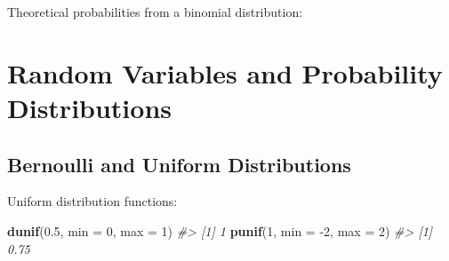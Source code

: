 \documentclass[]{book}
\newenvironment{Shaded}{\begin{snugshade}}{\end{snugshade}}
\newcommand{\CommentTok}[1]{\textcolor[rgb]{0.56,0.35,0.01}{\textit{#1}}}
\newcommand{\DataTypeTok}[1]{\textcolor[rgb]{0.13,0.29,0.53}{#1}}
\newcommand{\DecValTok}[1]{\textcolor[rgb]{0.00,0.00,0.81}{#1}}
\newcommand{\FloatTok}[1]{\textcolor[rgb]{0.00,0.00,0.81}{#1}}
\newcommand{\KeywordTok}[1]{\textcolor[rgb]{0.13,0.29,0.53}{\textbf{#1}}}
\newcommand{\NormalTok}[1]{#1}
\newcommand{\OperatorTok}[1]{\textcolor[rgb]{0.81,0.36,0.00}{\textbf{#1}}}
\newcommand{\OtherTok}[1]{\textcolor[rgb]{0.56,0.35,0.01}{#1}}
\newcommand{\StringTok}[1]{\textcolor[rgb]{0.31,0.60,0.02}{#1}}
\theoremstyle{definition}
\theoremstyle{definition}
\theoremstyle{definition}
\theoremstyle{remark}
\begin{document}
Theoretical probabilities from a binomial distribution:

\begin{Shaded}
\end{Shaded}

\hypertarget{random-variables-and-probability-distributions}{%
\section{Random Variables and Probability
Distributions}\label{random-variables-and-probability-distributions}}

\hypertarget{bernoulli-and-uniform-distributions}{%
\subsection{Bernoulli and Uniform
Distributions}\label{bernoulli-and-uniform-distributions}}

Uniform distribution functions:

\begin{Shaded}
\begin{Highlighting}[]
\KeywordTok{dunif}\NormalTok{(}\FloatTok{0.5}\NormalTok{, }\DataTypeTok{min =} \DecValTok{0}\NormalTok{, }\DataTypeTok{max =} \DecValTok{1}\NormalTok{)}
\CommentTok{#> [1] 1}
\KeywordTok{punif}\NormalTok{(}\DecValTok{1}\NormalTok{, }\DataTypeTok{min =} \DecValTok{-2}\NormalTok{, }\DataTypeTok{max =} \DecValTok{2}\NormalTok{)}
\CommentTok{#> [1] 0.75}
\end{Highlighting}
\end{Shaded}
\end{document}
